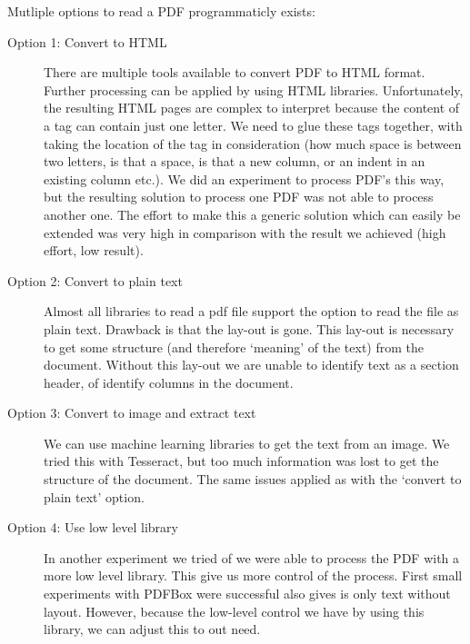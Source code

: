 \documentclass{ou-report}
\begin{document}
Mutliple options to read a PDF programmaticly exists:
\begin{description}
    \item[Option 1: Convert to HTML] There are multiple tools available to 
        convert PDF
        to HTML format. Further processing can be applied by using HTML
        libraries. Unfortunately, the resulting HTML pages are complex to
        interpret
        because the content of a  tag can contain just one letter. We need to 
        glue these 
        tags together, with taking the location of the tag in consideration
        (how much space is between two letters, is that a space, is that a 
        new column, or an indent in an existing column etc.). We did an 
        experiment to process PDF's this way, but the resulting solution to 
        process one PDF was not able to process another one. The effort to 
        make this a generic solution which can easily be extended was very high 
        in comparison with the result we achieved (high effort, low result).

    \item[Option 2: Convert to plain text] Almost all libraries to read a pdf 
        file 
        support the option to read the file as plain text. Drawback is that
        the lay-out is gone. This lay-out is necessary to get some structure
        (and therefore `meaning' of the text) from the document. Without this
        lay-out we are unable to identify text as a section header, of identify
        columns in the document.
    
    \item[Option 3: Convert to image and extract text] We can use machine 
        learning libraries to get the text from an image. We tried this 
        with Tesseract, but too much information was lost to get the 
        structure of the document. The same issues applied as with the `convert
        to plain text' option.

    \item[Option 4: Use low level library] In another experiment we tried of 
        we were able
        to process the PDF with a more low level library. This give us more
        control of the process. First small experiments with PDFBox were 
        successful also gives is only text without layout. However, because the
        low-level control we have by using this library, we can adjust this to
        out need.
\end{description}
\end{document}
